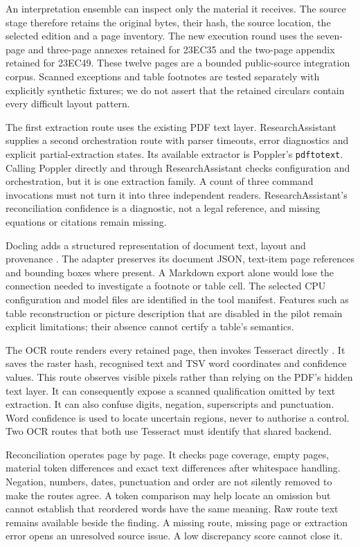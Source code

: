 An interpretation ensemble can inspect only the material it receives. The source
stage therefore retains the original bytes, their hash, the source location,
the selected edition and a page inventory. The new execution round uses the
seven-page and three-page annexes retained for 23EC35 and the two-page appendix
retained for 23EC49. These twelve pages are a bounded public-source integration
corpus. Scanned exceptions and table footnotes are tested separately with
explicitly synthetic fixtures; we do not assert that the retained circulars
contain every difficult layout pattern.

The first extraction route uses the existing PDF text layer. ResearchAssistant
supplies a second orchestration route with parser timeouts, error diagnostics and
explicit partial-extraction states. Its available extractor is Poppler's
\texttt{pdftotext}. Calling Poppler directly and through ResearchAssistant checks
configuration and orchestration, but it is one extraction family. A count of
three command invocations must not turn it into three independent readers.
ResearchAssistant's reconciliation confidence is a diagnostic, not a legal
reference, and missing equations or citations remain missing.

Docling adds a structured representation of document text, layout and provenance
\citep{doclingsoftware}. The adapter preserves its document JSON, text-item page
references and bounding boxes where present. A Markdown export alone would lose
the connection needed to investigate a footnote or table cell. The selected
CPU configuration and model files are identified in the tool manifest. Features
such as table reconstruction or picture description that are disabled in the
pilot remain explicit limitations; their absence cannot certify a table's
semantics.

The OCR route renders every retained page, then invokes Tesseract directly
\citep{tesseractsoftware}. It saves the raster hash, recognised text and TSV word
coordinates and confidence values. This route observes visible pixels rather
than relying on the PDF's hidden text layer. It can consequently expose a scanned
qualification omitted by text extraction. It can also confuse digits, negation,
superscripts and punctuation. Word confidence is used to locate uncertain
regions, never to authorise a control. Two OCR routes that both use Tesseract
must identify that shared backend.

Reconciliation operates page by page. It checks page coverage, empty pages,
material token differences and exact text differences after whitespace handling.
Negation, numbers, dates, punctuation and order are not silently removed to make
the routes agree. A token comparison may help locate an omission but cannot
establish that reordered words have the same meaning. Raw route text remains
available beside the finding. A missing route, missing page or extraction error
opens an unresolved source issue. A low discrepancy score cannot close it.

